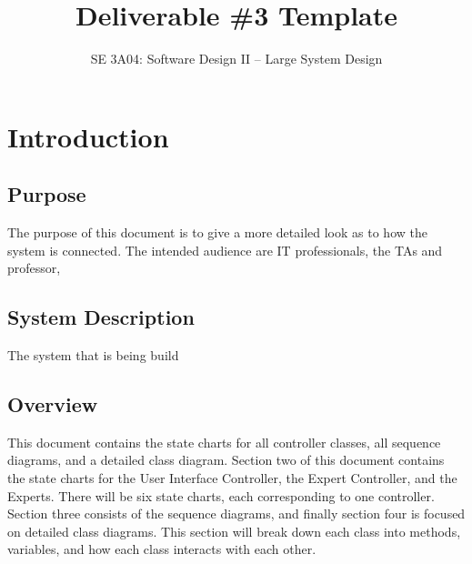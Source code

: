 \documentclass[]{article}
\title{Deliverable \#3 Template}
\author{SE 3A04: Software Design II -- Large System Design}
\date{}
\begin{document}
\maketitle	

\section{Introduction}
\label{sec:introduction}


\subsection{Purpose}
\label{sub:purpose}
The purpose of this document is to give a more detailed look as to how the system is connected. The intended audience are IT professionals, the TAs and professor, 
\subsection{System Description}
\label{sub:system_description}
The system that is being build 

\subsection{Overview}
\label{sub:overview}
This document contains the state charts for all controller classes, all sequence diagrams, and a detailed class diagram. Section two of this document contains the state charts for the User Interface Controller, the Expert Controller, and the Experts. There will be six state charts, each corresponding to one controller. Section three consists of the sequence diagrams, and finally section four is focused on detailed class diagrams. This section will break down each class into methods, variables, and how each class interacts with each other. 
\end{document}
